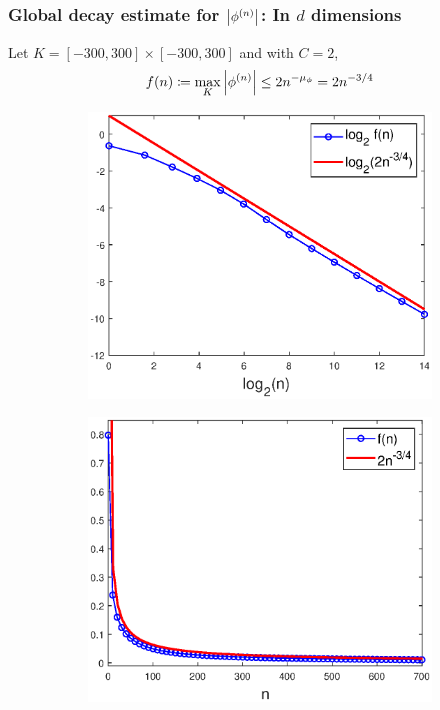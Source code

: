 \documentclass{beamer}
\theoremstyle{definition}
\begin{document}
\begin{frame}
\frametitle{Global decay estimate for $\abs{\phi^{(n)}}$: In $d$ dimensions}

Let $K = [-300,300]\times[-300,300]$ and with $C=2$,
\begin{equation*}
f(n)\coloneqq\max_{K}\abs{\phi^{(n)}}\leq 2n^{-\mu_\phi}= 2n^{-3/4}
\end{equation*}

\begin{figure}[!htb]
	\vspace{-10pt}
	\begin{subfigure}{0.49\textwidth}
		\centering
		\includegraphics[width=\textwidth]{Fig7a.eps}
	\end{subfigure}
	\begin{subfigure}{0.49\textwidth}
		\centering
		\includegraphics[width=\textwidth]{Fig7b.eps}
	\end{subfigure}
	\label{fig:Conv_Pwr_2}
\end{figure}

\end{frame}
\end{document}
